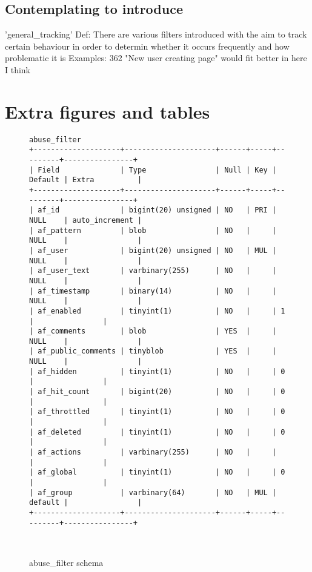 \subsection{Contemplating to introduce}

'general\_tracking'
  Def: There are various filters introduced with the aim to track certain behaviour in order to determin whether it occurs frequently and how problematic it is
  Examples: 362 "New user creating page" would fit better in here I think


\section{Extra figures and tables}
\label{app:appendix-figures}

\begin{figure*}
\begin{verbatim}
abuse_filter
+--------------------+---------------------+------+-----+---------+----------------+
| Field              | Type                | Null | Key | Default | Extra          |
+--------------------+---------------------+------+-----+---------+----------------+
| af_id              | bigint(20) unsigned | NO   | PRI | NULL    | auto_increment |
| af_pattern         | blob                | NO   |     | NULL    |                |
| af_user            | bigint(20) unsigned | NO   | MUL | NULL    |                |
| af_user_text       | varbinary(255)      | NO   |     | NULL    |                |
| af_timestamp       | binary(14)          | NO   |     | NULL    |                |
| af_enabled         | tinyint(1)          | NO   |     | 1       |                |
| af_comments        | blob                | YES  |     | NULL    |                |
| af_public_comments | tinyblob            | YES  |     | NULL    |                |
| af_hidden          | tinyint(1)          | NO   |     | 0       |                |
| af_hit_count       | bigint(20)          | NO   |     | 0       |                |
| af_throttled       | tinyint(1)          | NO   |     | 0       |                |
| af_deleted         | tinyint(1)          | NO   |     | 0       |                |
| af_actions         | varbinary(255)      | NO   |     |         |                |
| af_global          | tinyint(1)          | NO   |     | 0       |                |
| af_group           | varbinary(64)       | NO   | MUL | default |                |
+--------------------+---------------------+------+-----+---------+----------------+
\end{verbatim}
  \caption{abuse\_filter schema}~\label{fig:app-db-schemas-af}
\end{figure*}

